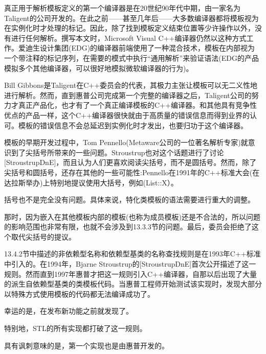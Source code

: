 真正用于解析模板定义的第一个编译器是在20世纪90年代中期，由一家名为Taligent的公司开发的。在此之前——甚至几年后——大多数编译器都将模板视为在实例化时才处理的标记。因此，除了找到模板定义结束位置等少许操作以外，没有进行任何解析。撰写本文时，Microsoft Visual C++编译器仍然以这种方式工作。爱迪生设计集团(EDG)的编译器前端使用了一种混合技术，模板在内部视为一个带注释的标记序列，在需要的模式中执行“通用解析”来验证语法(EDG的产品模拟多个其他编译器，可以很好地模拟微软编译器的行为)。

Bill Gibbons是Taligent在C++委员会的代表，其极力主张让模板可以无二义性地进行解析。然而，直到惠普公司完成第一个完整的编译器之后，Taligent公司的努力才真正产品化，也才有了一个真正编译模板的C++编译器。和其他具有竞争性优点的产品一样，这个C++编译器很快就由于高质量的错误信息而得到业界的认可。模板的错误信息不会总延迟到实例化时才发出，也要归功于这个编译器。

模板的早期开发过程中，Tom Pennello(Metaware公司的一位著名解析专家)就意识到了尖括号所带来的一些问题。Stroustrup也对这个话题进行了讨论[StroustrupDnE]，而且认为人们更喜欢阅读尖括号，而不是圆括号。然而，除了尖括号和圆括号，还存在其他的一些可能性:Pennello在1991年的C++标准大会(在达拉斯举办)上特别地提议使用大括号，例如(List{::X}）。

\begin{tcolorbox}[colback=webgreen!5!white,colframe=webgreen!75!black]
\hspace*{0.75cm}括号也不是完全没有问题。具体来说，特化类模板的语法需要进行重大的调整。
\end{tcolorbox}

那时，因为嵌入在其他模板内部的模板(也称为成员模板)还是不合法的，所以问题的影响范围也非常有限，也就不会涉及到13.3.3节的问题。最后，委员会拒绝了这个取代尖括号的提议。

13.4.2节中描述的非依赖型名称和依赖型基类的名称查找规则是在1993年C++标准中引入的。在1994年，Bjarne Stroustrup的[StroustrupDnE]首次公开描述了这一规则。然而直到1997年惠普才把这一规则引入C++编译器，自那以后出现了大量的派生自依赖型基类的类模板代码。当惠普工程师开始测试该实现时，发现大部分以特殊方式使用模板的代码都无法编译成功了。

\begin{tcolorbox}[colback=webgreen!5!white,colframe=webgreen!75!black]
\hspace*{0.75cm}幸运的是，在发布新功能之前就发现了。
\end{tcolorbox}

特别地，STL的所有实现都打破了这一规则。

\begin{tcolorbox}[colback=webgreen!5!white,colframe=webgreen!75!black]
\hspace*{0.75cm}具有讽刺意味的是，第一个实现也是由惠普开发的。
\end{tcolorbox}

